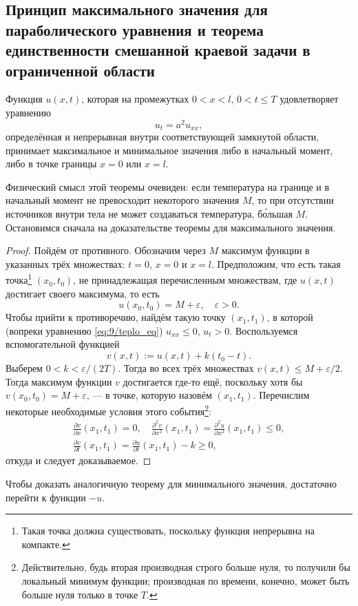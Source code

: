 \subsection{Принцип максимального значения для параболического уравнения и теорема единственности смешанной краевой задачи в ограниченной области}
\label{maximum_principle}

\begin{theorem} Функция $ u(x, t) $, которая на промежутках $ 0 < x < l $, $ 0 <
  t \leqslant T$ удовлетворяет уравнению
\begin{equation}
  \label{eq:9/teplo_eq}
  u_t = a^2u_{xx},
\end{equation}
определённая и непрерывная внутри соответствующей замкнутой области, принимает максимальное и минимальное значения либо в начальный момент, либо в
точке границы $ x = 0 $ или $ x = l $.\end{theorem}

Физический смысл этой теоремы очевиден: если
температура на
границе и в начальный момент не превосходит некоторого значения
$ M $, то при отсутствии источников внутри тела не может создаваться
температура, б\'{о}льшая $ M $. Остановимся сначала на доказательстве
теоремы для максимального значения.

\begin{proof}Пойдём от противного. Обозначим через $ M $ максимум функции в указанных трёх
множествах: $ t = 0 $, $ x = 0 $ и $ x = l $. Предположим, что есть такая
точка\footnote{Такая точка должна существовать, поскольку функция непрерывна на компакте.}
$ (x_0, t_0) $, не принадлежащая перечисленным множествам, где $ u(x, t) $
достигает своего максимума, то есть 
\[
    u(x_0, t_0) = M + \varepsilon, \quad \varepsilon > 0.
\]
Чтобы прийти к противоречию, найдём такую точку $ (x_1, t_1) $, в которой
(вопреки уравнению \eqref{eq:9/teplo_eq}) $ u_{xx} \leqslant 0 $, $ u_t > 0 $.
Воспользуемся вспомогательной функцией  
\[
    v(x, t) := u(x, t) + k(t_0 - t).
\]
Выберем $ 0 < k < \varepsilon/(2T) $. Тогда во всех трёх множествах $
v(x, t) \leqslant M + \varepsilon/2 $. Тогда максимум функции $ v $ достигается
где-то ещё, поскольку хотя бы $ v(x_0, t_0) = M + \varepsilon $, --- в точке,
которую назовём $ (x_1, t_1) $.
Перечислим некоторые необходимые условия этого события\footnote{Действительно,
  будь вторая производная строго больше нуля, то получили бы локальный минимум функции; производная по времени, конечно, может быть больше нуля только в точке $ T $.}: 
\begin{gather*}
    \frac{\partial v}{\partial x}(x_1, t_1) = 0, \quad \frac{\partial^2
    v}{\partial x^2}(x_1, t_1) = \frac{\partial^2 u}{\partial x^2}(x_1, t_1) \leqslant 0,\\
    \frac{\partial v}{\partial t}(x_1, t_1) = \frac{\partial u}{\partial t}(x_1,
    t_1) - k \geqslant 0,
\end{gather*}
откуда и следует доказываемое.
\end{proof}
Чтобы доказать аналогичную теорему для минимального значения, достаточно перейти
к функции $ -u $.

